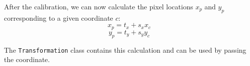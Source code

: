 \documentclass{article}
\newcommand{\inlverb}[1]{\colorbox{cverbbg}{\texttt{#1}}}
\begin{document}
After the calibration, we can now calculate the pixel locations \(x_p\) and \(y_p\) corresponding to a given coordinate \(c\):
\begin{equation}
x_p = t_x + s_x x_c
\end{equation}
\begin{equation}
y_p = t_y + s_y y_c
\end{equation}

The \inlverb{Transformation} class contains this calculation and can be used by passing the coordinate.
\end{document}
